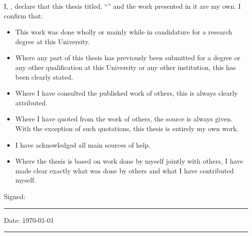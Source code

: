 \documentclass[
11pt, %
english, %
onehalfspacing, %
headsepline, %
]{MastersDoctoralThesis} %
\theoremstyle{customdefstyle}
\begin{document}
\begin{declaration}
\addchaptertocentry{\authorshipname} %
\noindent I, \authorname, declare that this thesis titled, \enquote{\ttitle} and the work presented in it are my own. I confirm that:

\begin{itemize} 
\item This work was done wholly or mainly while in candidature for a research degree at this University.
\item Where any part of this thesis has previously been submitted for a degree or any other qualification at this University or any other institution, this has been clearly stated.
\item Where I have consulted the published work of others, this is always clearly attributed.
\item Where I have quoted from the work of others, the source is always given. With the exception of such quotations, this thesis is entirely my own work.
\item I have acknowledged all main sources of help.
\item Where the thesis is based on work done by myself jointly with others, I have made clear exactly what was done by others and what I have contributed myself.\\
\end{itemize}
 
\noindent Signed: \authorname \\
\rule[0.5em]{25em}{0.5pt} %
 
\noindent Date: \monthyeardate\today\\
\rule[0.5em]{25em}{0.5pt} %
\end{declaration}

\let\cleardoublepage\clearpage


\vspace*{0.2\textheight}


\end{document}
